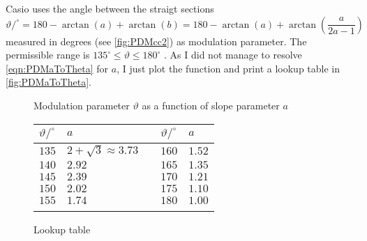 \documentclass[a4paper]{article}
\newcommand{\TODO}[1]{%
  \fboxsep=1pt\fboxrule=1pt\fcolorbox{yellow}{white}{[\textbf{TODO:~}#1]}%
}
\begin{document}
Casio uses the angle between the straigt sections
\begin{equation}
  \label{eqn:PDMaToTheta}
  \vartheta/^{\circ} 
  = 180-\arctan(a)+\arctan(b)
  = 180-\arctan(a)+\arctan\!\left(\frac{a}{2a-1}\right)
\end{equation}
measured in degrees (see \cref{fig:PDMcc2}) as modulation parameter. The
permissible range is $135^\circ\leq\vartheta\leq 180^\circ$ \TODO{\cite{}}. As I
did not manage to resolve \cref{eqn:PDMaToTheta} for $a$, I just plot the
function and print a lookup table in \cref{fig:PDMaToTheta}.
%
\begin{figure*}
  \centering
  \begin{subfigure}{0.45\textwidth}
    \centering
    \caption{Modulation parameter $\vartheta$ as a function of slope parameter $a$}
  \end{subfigure}
  \begin{subfigure}{0.45\textwidth}
    \centering
    \begin{tabular}{llcll}\\ \toprule
      $\vartheta/^\circ$ & $a$ & & $\vartheta/^\circ$ & $a$  \\\midrule
      $135$ & $2\!+\!\sqrt{3}\approx 3.73$ && $160$ & $1.52$ \\
      $140$ & $2.92$                       && $165$ & $1.35$ \\
      $145$ & $2.39$                       && $170$ & $1.21$ \\
      $150$ & $2.02$                       && $175$ & $1.10$ \\
      $155$ & $1.74$                       && $180$ & $1.00$ \\\bottomrule \\
    \end{tabular}
    \caption{Lookup table}
  \end{subfigure}
  \caption{Relation between modulation parameter $\vartheta$ and slope parameter 
  $a$, see \cref{eqn:PDMaToTheta}\label{fig:PDMaToTheta}}
\end{figure*}
\end{document}
